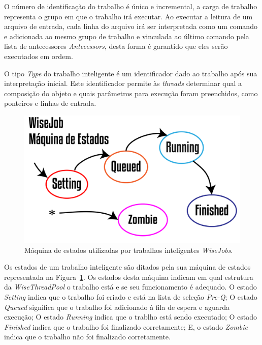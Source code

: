 O número de identificação do trabalho é único e incremental, a carga de trabalho representa o grupo em que o trabalho irá executar. Ao executar a leitura de um arquivo de entrada, cada linha do arquivo irá ser interpretada como um comando e adicionada ao mesmo grupo de trabalho e vinculada ao último comando pela lista de antecessores \textit{Antecessors}, desta forma é garantido que eles serão executados em ordem.

O tipo \textit{Type} do trabalho inteligente é um identificador dado ao trabalho após sua interpretação inicial. Este identificador permite às \textit{threads} determinar qual a composição do objeto e quais parâmetros para execução foram preenchidos, como ponteiros e linhas de entrada. 

\begin{figure}[!htbp]
	\centering
	\includegraphics[width=\linewidth]{Figures/WiseJobStatus@16x.png}
	\caption{Máquina de estados utilizadas por trabalhos inteligentes \textit{WiseJobs}.}
	\label{fig9:wise_jobs}
\end{figure}

Os estados de um trabalho inteligente são ditados pela sua máquina de estados representada na Figura~\ref{fig9:wise_jobs}. Os estados desta máquina indicam em qual estrutura da \textit{WiseThreadPool} o trabalho está e se seu funcionamento é adequado. O estado \textit{Setting} indica que o trabalho foi criado e está na lista de seleção \textit{Pre-Q}; O estado \textit{Queued} significa que o trabalho foi adicionado à fila de espera e aguarda execução; O estado \textit{Running} indica que o trablho está sendo executado; O estado \textit{Finished} indica que o trabalho foi finalizado corretamente; E, o estado \textit{Zombie} indica que o trabalho não foi finalizado corretamente. 

